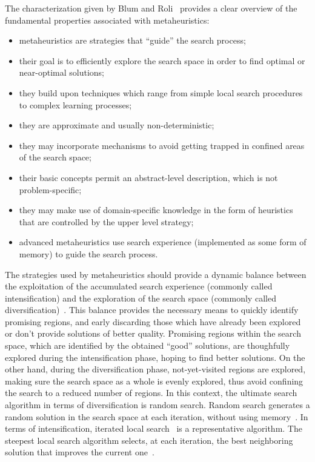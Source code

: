 The characterization given by Blum and Roli~\cite{Blum-Metaheuristics_in_combinatorial_optimization_overview_and_coconceptual_comparison:2003}
provides a clear overview of the fundamental properties associated
with metaheuristics:
\begin{itemize}
\item metaheuristics are strategies that \textquotedblleft{}guide\textquotedblright{}
the search process;
\item their goal is to efficiently explore the search space in order to
find optimal or near-optimal solutions;
\item they build upon techniques which range from simple local search procedures
to complex learning processes;
\item they are approximate and usually non-deterministic;
\item they may incorporate mechanisms to avoid getting trapped in confined
areas of the search space;
\item their basic concepts permit an abstract-level description, which is
not problem-specific;
\item they may make use of domain-specific knowledge in the form of heuristics
that are controlled by the upper level strategy;
\item advanced metaheuristics use search experience (implemented as some
form of memory) to guide the search process.
\end{itemize}
The strategies used by metaheuristics should provide a dynamic balance
between the exploitation of the accumulated search experience (commonly
called intensification) and the exploration of the search space (commonly
called diversification)~\cite{Blum-Metaheuristics_in_combinatorial_optimization_overview_and_coconceptual_comparison:2003}.
This balance provides the necessary means to quickly identify promising
regions, and early discarding those which have already been explored
or don't provide solutions of better quality. Promising regions within
the search space, which are identified by the obtained ``good''
solutions, are thoughfully explored during the intensification phase,
hoping to find better solutions. On the other hand, during the diversification
phase, not-yet-visited regions are explored, making sure the search
space as a whole is evenly explored, thus avoid confining the search
to a reduced number of regions. In this context, the ultimate search
algorithm in terms of diversification is random search. Random search
generates a random solution in the search space at each iteration,
without using memory~\cite{Talbi_Metaheuristics:2009}. In terms
of intensification, iterated local search~\cite{Lourencco-Iterated_local_search:2003}
is a representative algorithm. The steepest local search algorithm
selects, at each iteration, the best neighboring solution that improves
the current one~\cite{Talbi_Metaheuristics:2009}.

